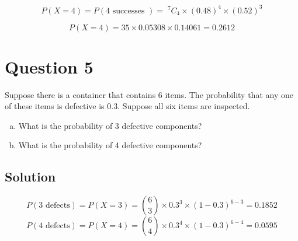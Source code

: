 \documentclass[a4paper,12pt]{article}
\begin{document}
	
	
	
	\[ P(X=4) = P(4 \mbox{ successes }) = \;^7C_4  \times (0.48)^{4} \times (0.52)^{3}\]
	
	\[ P(X=4) = 35 \times 0.05308 \times  0.14061 =  {0.2612} \]
\section*{Question 5}
	Suppose there is a container that contains 6 items.  The probability that any one of these items is defective is 0.3. Suppose all six items are inspected. 
	\begin{enumerate}[(a)]
		\item What is the probability of 3 defective components?
		\item What is the probability of 4 defective components?
	\end{enumerate}
\subsection*{Solution}	
	\[ P(3\text{ defects}) = P(X = 3) = {6\choose 3} \times 0.3^3 \times  (1-0.3)^{6-3} = 0.1852 \]
	\[ P(4\text{ defects})  = P(X = 4) = {6\choose 4}\times 0.3^4\times  (1-0.3)^{6-4} = 0.0595 \]
\end{document}
